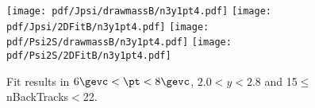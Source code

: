 \begin{figure}[H]
\begin{center}
\texttt{[image: pdf/Jpsi/drawmassB/n3y1pt4.pdf]}
\texttt{[image: pdf/Jpsi/2DFitB/n3y1pt4.pdf]}
\vspace*{-0.5cm}
\texttt{[image: pdf/Psi2S/drawmassB/n3y1pt4.pdf]}
\texttt{[image: pdf/Psi2S/2DFitB/n3y1pt4.pdf]}
\vspace*{-0.5cm}
\end{center}
\caption{Fit results in $6\gevc<\pt<8\gevc$, $2.0<y<2.8$ and 15$\leq$nBackTracks$<$22.}
\label{Fitn3y1pt4}
\end{figure}
